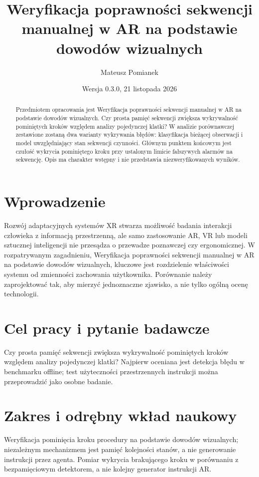 \documentclass[11pt,a4paper]{article}
\title{Weryfikacja poprawności sekwencji manualnej w AR na podstawie dowodów wizualnych}
\author{Mateusz Pomianek}
\date{Wersja 0.3.0, 21 listopada 2026}
\begin{document}
\maketitle

\begin{abstract}

Przedmiotem opracowania jest Weryfikacja poprawności sekwencji manualnej w AR na podstawie dowodów wizualnych. Czy prosta pamięć sekwencji zwiększa wykrywalność pominiętych kroków względem analizy pojedynczej klatki? W analizie porównawczej zestawione zostaną dwa warianty wykrywania błędów: klasyfikacja bieżącej obserwacji i model uwzględniający stan sekwencji czynności. Głównym punktem końcowym jest czułość wykrycia pominiętego kroku przy ustalonym limicie fałszywych alarmów na sekwencję. Opis ma charakter wstępny i nie przedstawia niezweryfikowanych wyników.

\end{abstract}

\section{Wprowadzenie}

Rozwój adaptacyjnych systemów XR stwarza możliwość badania interakcji człowieka z informacją przestrzenną, ale samo zastosowanie AR, VR lub modeli sztucznej inteligencji nie przesądza o przewadze poznawczej czy ergonomicznej. W rozpatrywanym zagadnieniu, Weryfikacja poprawności sekwencji manualnej w AR na podstawie dowodów wizualnych, kluczowe jest rozdzielenie właściwości systemu od zmienności zachowania użytkownika. Porównanie należy zaprojektować tak, aby mierzyć jednoznaczne zjawisko, a nie tylko ogólną ocenę technologii.

\section{Cel pracy i pytanie badawcze}

Czy prosta pamięć sekwencji zwiększa wykrywalność pominiętych kroków względem analizy pojedynczej klatki? Najpierw oceniana jest detekcja błędu w benchmarku offline; test użyteczności przestrzennych instrukcji można przeprowadzić jako osobne badanie.

\section{Zakres i odrębny wkład naukowy}
Weryfikacja pominięcia kroku procedury na podstawie dowodów wizualnych; niezależnym mechanizmem jest pamięć kolejności stanów, a nie generowanie instrukcji przez agenta. Pomiar wykrycia brakującego kroku w porównaniu z bezpamięciowym detektorem, a nie kolejny generator instrukcji AR.
\end{document}
